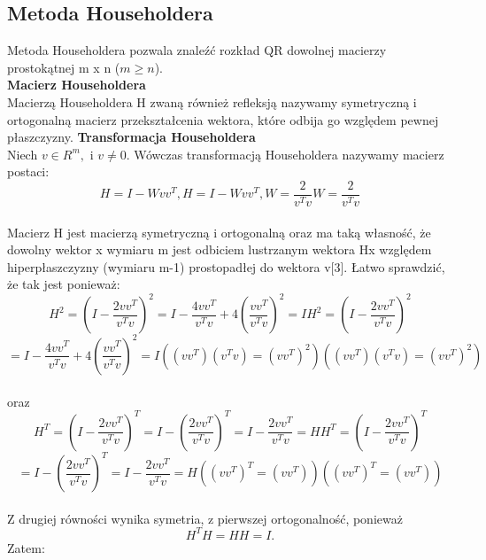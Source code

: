 \documentclass[10pt,a4paper]{report}
\begin{document}
\subsection*{Metoda Householdera}

\noindent Metoda Householdera pozwala znaleźć rozkład QR dowolnej macierzy prostokątnej m x n ($m\ge n$).\\

\noindent \textbf{Macierz Householdera}\\
\noindent Macierzą Householdera H zwaną również refleksją nazywamy symetryczną i ortogonalną macierz przekształcenia wektora, które odbija go względem pewnej płaszczyzny. 
\newpage
\noindent \textbf{Transformacja Householdera}\\
\noindent Niech  $v\in R^{m}, $ i $v\neq 0. $ Wówczas transformacją Householdera nazywamy macierz postaci:\\

$${\displaystyle H=I-Wvv^{T}, } {\displaystyle H=I-Wvv^{T}, }       {\displaystyle W={\frac {2}{v^{T}v}}} {\displaystyle W={\frac {2}{v^{T}v}}}$$ \\
Macierz H jest macierzą symetryczną i ortogonalną oraz ma taką własność, że dowolny wektor x wymiaru m jest odbiciem lustrzanym wektora Hx względem hiperpłaszczyzny (wymiaru m-1) prostopadłej do wektora v[3]. Łatwo sprawdzić, że tak jest ponieważ: \\

$${\displaystyle H^{2}=\left(I-{\frac {2vv^{T}}{v^{T}v}}\right)^{2}=I-{\frac {4vv^{T}}{v^{T}v}}+4\left({\frac {vv^{T}}{v^{T}v}}\right)^{2}=I} {\displaystyle H^{2}=\left(I-{\frac {2vv^{T}}{v^{T}v}}\right)^{2}}$$ \newline  $$= {I-{\frac {4vv^{T}}{v^{T}v}}+4\left({\frac {vv^{T}}{v^{T}v}}\right)^{2}=I}       {\displaystyle ((vv^{T})(v^{T}v)=(vv^{T})^{2})} {\displaystyle ((vv^{T})(v^{T}v)=(vv^{T})^{2})}$$\\
oraz\\

$${\displaystyle H^{T}=\left(I-{\frac {2vv^{T}}{v^{T}v}}\right)^{T}=I-\left({\frac {2vv^{T}}{v^{T}v}}\right)^{T}=I-{\frac {2vv^{T}}{v^{T}v}}=H} {\displaystyle H^{T}=\left(I-{\frac {2vv^{T}}{v^{T}v}}\right)^{T}}$$ \newline $$={I-\left({\frac {2vv^{T}}{v^{T}v}}\right)^{T}=I-{\frac {2vv^{T}}{v^{T}v}}=H}       {\displaystyle ((vv^{T})^{T}=(vv^{T}))} {\displaystyle ((vv^{T})^{T}=(vv^{T}))}$$\\
Z drugiej równości wynika symetria, z pierwszej ortogonalność, ponieważ $${\displaystyle H^{T}H=HH=I}. $$ Zatem:\\
\end{document}
